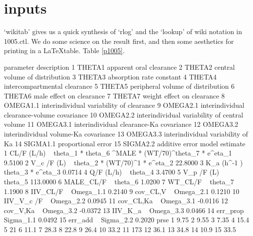 \section{inputs}
`wikitab' gives us a quick synthesis of `rlog' and the `lookup' of wiki notation in 1005.ctl.
We do some science on the result first, and then some aesthetics for printing in a \LaTeX table.  Table \ref{p1005}.
\begin{Schunk}
\begin{Soutput}
   parameter                                   description
1     THETA1                       apparent oral clearance
2     THETA2                central volume of distribution
3     THETA3                      absorption rate constant
4     THETA4                  intercompartmental clearance
5     THETA5             peripheral volume of distribution
6     THETA6                      male effect on clearance
7     THETA7                    weight effect on clearance
8   OMEGA1.1      interindividual variability of clearance
9   OMEGA2.1   interindividual clearance-volume covariance
10  OMEGA2.2 interindividual variability of central volume
11  OMEGA3.1       interindividual clearance-Ka covariance
12  OMEGA3.2          interindividual volume-Ka covariance
13  OMEGA3.3             interindividual variability of Ka
14  SIGMA1.1                            proportional error
15  SIGMA2.2                                additive error
                                                               model estimate
1  CL/F (L/h) ~ theta_1 * theta_6 ^MALE * (WT/70)^theta_7  * e^eta_1   9.5100
2                         V_c /F (L) ~ theta_2 * (WT/70)^1 * e^eta_2  22.8000
3                                    K_a (h^-1 ) ~ theta_3 * e^eta_3   0.0714
4                                                Q/F (L/h) ~ theta_4   3.4700
5                                               V_p /F (L) ~ theta_5 113.0000
6                                                MALE_CL/F ~ theta_6   1.0200
7                                                  WT_CL/F ~ theta_7   1.1900
8                                               IIV_CL/F ~ Omega_1.1   0.2140
9                                               cov_CL,V ~ Omega_2.1   0.1210
10                                            IIV_V_c /F ~ Omega_2.2   0.0945
11                                            cov_CL,Ka  ~ Omega_3.1  -0.0116
12                                             cov_V,Ka  ~ Omega_3.2  -0.0372
13                                              IIV_K_a  ~ Omega_3.3   0.0466
14                                              err_prop ~ Sigma_1.1   0.0492
15                                               err_add ~ Sigma_2.2   0.2020
   prse
1  9.75
2  9.55
3  7.35
4  15.4
5    21
6  11.1
7  28.3
8  22.8
9  26.4
10 33.2
11  173
12 36.1
13 34.8
14 10.9
15 33.5
\end{Soutput}
\end{Schunk}

